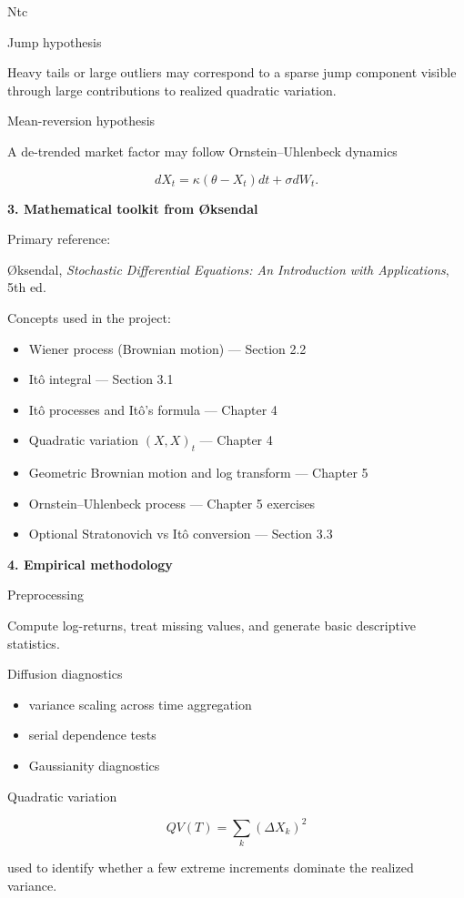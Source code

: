 Ntc\documentclass[11pt]{article}
\begin{document}
	Jump hypothesis
	
	Heavy tails or large outliers may correspond to a sparse jump component visible through large contributions to realized quadratic variation.
	
	Mean-reversion hypothesis
	
	A de-trended market factor may follow Ornstein–Uhlenbeck dynamics
	
	\[
	dX_t=\kappa(\theta-X_t)dt+\sigma dW_t.
	\]
	
	\textbf{3. Mathematical toolkit from Øksendal}
	
	Primary reference:
	
	Øksendal, \emph{Stochastic Differential Equations: An Introduction with Applications}, 5th ed.
	
	Concepts used in the project:
	
	\begin{itemize}
		\item Wiener process (Brownian motion) — Section 2.2
		\item Itô integral — Section 3.1
		\item Itô processes and Itô’s formula — Chapter 4
		\item Quadratic variation \((X,X)_t\) — Chapter 4
		\item Geometric Brownian motion and log transform — Chapter 5
		\item Ornstein–Uhlenbeck process — Chapter 5 exercises
		\item Optional Stratonovich vs Itô conversion — Section 3.3
	\end{itemize}
	
	\textbf{4. Empirical methodology}
	
	Preprocessing
	
	Compute log-returns, treat missing values, and generate basic descriptive statistics.
	
	Diffusion diagnostics
	
	\begin{itemize}
		\item variance scaling across time aggregation
		\item serial dependence tests
		\item Gaussianity diagnostics
	\end{itemize}
	
	Quadratic variation
	
	\[
	QV(T)=\sum_k (\Delta X_k)^2
	\]
	
	used to identify whether a few extreme increments dominate the realized variance.
	
\end{document}
